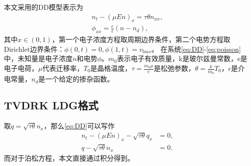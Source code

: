 本文采用的DD模型表示为
\begin{align}
    n_t - (\mu En)_x = \tau \theta n_{xx}, \label{eq:DD} \\
    \phi_{xx} = \frac{e}{\epsilon}(n - n_d),  \label{eq:poisson}
\end{align}
其中$x\in(0,1)$，第一个电子浓度方程取周期边界条件，第二个电势方程取Dirichlet边界条件：$\phi(0,t) = 0, \phi(1,t) = v_{bias}$。
在系统\eqref{eq:DD}-\eqref{eq:poisson}中，未知量是电子浓度$n$和电势$\phi$。$m_0$表示电子有效质量，k是玻尔兹曼常数，e是电子电荷，$\mu$代表迁移率，$T_0$是晶格温度，$\tau = \frac{m_0 \mu}{e}$是松弛参数，$\theta = \frac{k}{m_0}T_0$，$\epsilon$是介电常量，$n_d$是一个给定的掺杂函数。

\subsection{TVDRK LDG格式}
取$q = \sqrt{\tau \theta }n_x$，那么\autoref{eq:DD}可以写作
\begin{align}
    n_t - (\mu E n)_x - \sqrt{\tau \theta}q_x & = 0, \label{eq:DD:electronConcentration} \\
    q - \sqrt{\tau \theta}n_x                 & = 0. \label{eq:DD:auxiliaryFunction}
\end{align}
而对于泊松方程，本文直接通过积分得到。

